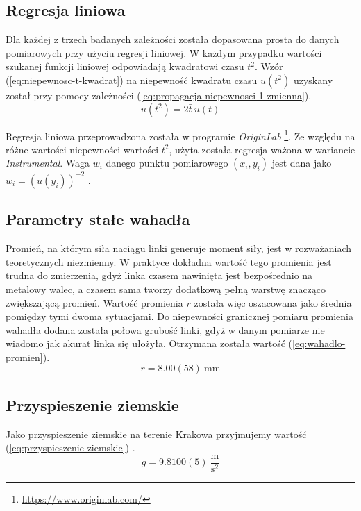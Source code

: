 \documentclass[twocolumn, a4paper, polish, 10pt]{article}
\begin{document}
\subsection{Regresja liniowa}
Dla każdej z trzech badanych zależności została dopasowana prosta do danych pomiarowych przy użyciu regresji liniowej.
W każdym przypadku wartości szukanej funkcji liniowej odpowiadają kwadratowi czasu $t^2$.
Wzór (\ref{eq:niepewnosc-t-kwadrat}) na niepewność kwadratu czasu $u(t^2)$ uzyskany został przy pomocy zależności (\ref{eq:propagacja-niepewnosci-1-zmienna}).
\begin{equation}
    u(t^2) = 2\bar{t}~u(t)
    \label{eq:niepewnosc-t-kwadrat}
\end{equation}

Regresja liniowa przeprowadzona została w programie \textit{OriginLab} \footnote{\url{https://www.originlab.com/}}.
Ze względu na różne wartości niepewności wartości $t^2$, użyta została regresja ważona w wariancie \textit{Instrumental}.
Waga $w_i$ danego punktu pomiarowego $(x_i, y_i)$ jest dana jako $w_i = \left( u(y_i) \right)^{-2}$ \cite{origin-fitting-weighting}.

\subsection{Parametry stałe wahadła}
\label{sec:parametry-stale-wahadla}
Promień, na którym siła naciągu linki generuje moment siły, jest w rozważaniach teoretycznych niezmienny.
W praktyce dokładna wartość tego promienia jest trudna do zmierzenia, gdyż linka czasem nawinięta jest bezpośrednio na metalowy walec, a czasem sama tworzy dodatkową pełną warstwę znacząco zwiększającą promień.
Wartość promienia $r$ została więc oszacowana jako średnia pomiędzy tymi dwoma sytuacjami.
Do niepewności granicznej pomiaru promienia wahadła dodana została połowa grubość linki, gdyż w danym pomiarze nie wiadomo jak akurat linka się ułożyła.
Otrzymana została wartość (\ref{eq:wahadlo-promien}).
\begin{equation}
    r = 8.00(58)~\mathrm{mm}
    \label{eq:wahadlo-promien}
\end{equation}

\subsection{Przyspieszenie ziemskie}
Jako przyspieszenie ziemskie na terenie Krakowa przyjmujemy wartość (\ref{eq:przyspieszenie-ziemskie}) \cite{przyspieszenie-ziemskie-krakow}.
\begin{equation}
    g = 9.8100(5)~\mathrm{\frac{m}{s^2}}
    \label{eq:przyspieszenie-ziemskie}
\end{equation}
\end{document}
